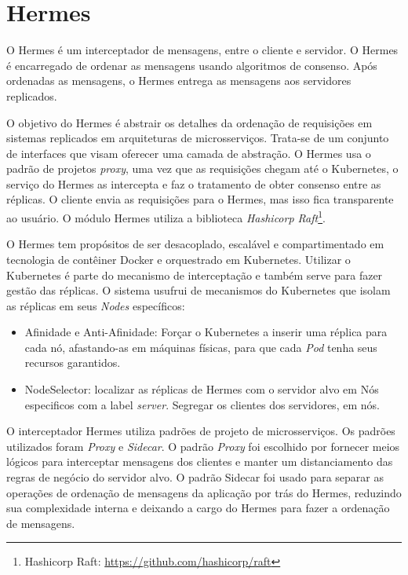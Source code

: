 \chapter{Hermes}
\label{cap:hermes}

O Hermes \cite{renan2021hermes} é um interceptador de mensagens, entre o cliente e servidor. O Hermes é encarregado de ordenar as mensagens usando algoritmos de consenso. Após ordenadas as mensagens, o Hermes entrega as mensagens aos servidores replicados.

O objetivo do Hermes é abstrair os detalhes da ordenação de requisições em sistemas replicados em arquiteturas de microsserviços. Trata-se de um conjunto de interfaces que visam oferecer uma camada de abstração. O Hermes usa o padrão de projetos \textit{proxy}, uma vez que as requisições chegam até o Kubernetes, o serviço do Hermes as intercepta e faz o tratamento de obter consenso entre as réplicas. O cliente envia as requisições para o Hermes, mas isso fica transparente ao usuário. O módulo Hermes utiliza a biblioteca \textit{Hashicorp Raft}\footnote{Hashicorp Raft: \url{https://github.com/hashicorp/raft}}.


O Hermes tem propósitos de ser desacoplado, escalável e compartimentado em tecnologia de contêiner Docker e orquestrado em Kubernetes. Utilizar o Kubernetes é parte do mecanismo de interceptação e também serve para fazer gestão das réplicas. O sistema usufrui de mecanismos do Kubernetes que isolam as réplicas em seus \textit{Nodes} específicos:

\begin{itemize}
\item Afinidade e Anti-Afinidade: Forçar o Kubernetes a inserir uma réplica para cada nó, afastando-as em máquinas físicas, para que cada \textit{Pod} tenha seus recursos garantidos.
\item NodeSelector: localizar as réplicas de Hermes com o servidor alvo em Nós especificos com a label \textit{server}. Segregar os clientes dos servidores, em nós.
\end{itemize}

O interceptador Hermes utiliza padrões de projeto de microsserviços. Os padrões utilizados foram \textit{Proxy} e \textit{Sidecar}. O padrão \textit{Proxy} foi escolhido por fornecer meios lógicos para interceptar mensagens dos clientes e manter um distanciamento das regras de negócio do servidor alvo. O padrão Sidecar foi usado para separar as operações de ordenação de mensagens da aplicação por trás do Hermes, reduzindo sua complexidade interna e deixando a cargo do Hermes para fazer a ordenação de mensagens.

